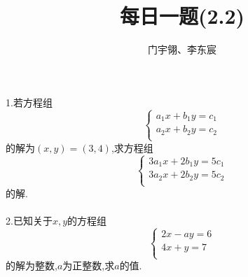 \documentclass[UTF8]{ctexart}
\title{每日一题(2.2)}
\author{门宇翎、李东宸}
\begin{document}
\maketitle
\begin{flushleft}
1.若方程组
\[\begin{cases}
a_1x+b_1y=c_1\\a_2x+b_2y=c_2\\
\end{cases}\]
的解为$(x,y)=(3,4)$,求方程组
\[\begin{cases}
3a_1x+2b_1y=5c_1\\3a_2x+2b_2y=5c_2\\
\end{cases}\]
的解.\\\quad\\
2.已知关于$x,y$的方程组
\[\begin{cases}
2x-ay=6\\4x+y=7\\
\end{cases}\]
的解为整数,$a$为正整数,求$a$的值.
\end{flushleft}
\end{document}
